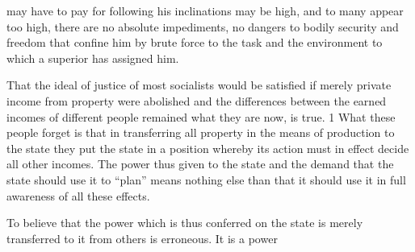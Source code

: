 \documentclass[11pt,openany]{book}
\begin{document}
may have to pay for following his inclinations may be high, and to many appear too high, there are no absolute impediments, no dangers to bodily security and freedom that confine him by brute force to the task and the environment to which a superior has assigned him.

That the ideal of justice of most socialists would be satisfied if merely private income from property were abolished and the differences between the earned incomes of different people remained what they are now, is true. 1 What these people forget is that in transferring all property in the means of production to the state they put the state in a position whereby its action must in effect decide all other incomes. The power thus given to the state and the demand that the state should use it to ``plan'' means nothing else than that it should use it in full awareness of all these effects.

To believe that the power which is thus conferred on the state is merely transferred to it from others is erroneous. It is a power
\end{document}
